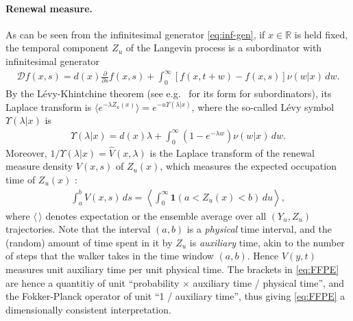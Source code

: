 \documentclass[a4paper,12pt]{article}
\numberwithin{equation}{section}
\theoremstyle{plain}
\theoremstyle{definition}
\theoremstyle{remark}
\numberwithin{equation}{section}
\newcommand{\spc}{\mathbb R}
\newcommand{\1}{\mathbf 1}
\begin{document}
\paragraph{Renewal measure.}
As can be seen from the infinitesimal generator \eqref{eq:inf-gen},
if $x \in \spc$ is held fixed, the temporal component $Z_u$ of the Langevin
process
is a subordinator with infinitesimal generator
\begin{align}
\mathcal D f(x,s) = d(x) \frac{\partial }{\partial s} f(x,s)
+ \int_0^\infty [f(x, t+w) - f(x,s)] \nu(w|x)\,dw.
\end{align}
By the L\'evy-Khintchine theorem (see e.g.\ \cite{Bertoin04} for its form
for subordinators), its Laplace transform is
$\langle e^{-\lambda Z_u(x)} \rangle = e^{-u \Upsilon(\lambda|x)}$, where the
so-called L\'evy symbol $\Upsilon(\lambda|x)$ is
\begin{align}
\Upsilon(\lambda|x) = d(x) \lambda + \int_0^\infty (1-e^{-\lambda w})
\nu(w|x)\, dw.  
\end{align}
Moreover, $1/\Upsilon(\lambda| x) = \hat V(x, \lambda)$ is the Laplace
transform of the renewal measure density $V(x,s)$ of $Z_u(x)$, which measures
the expected occupation time of $Z_u(x)$ \cite{Bertoin04}:
\begin{align}
\int_a^b V(x,s)\, ds = \left \langle \int_0^\infty \1(a < Z_u(x) < b)\,du
\right \rangle,  
\end{align}
where $\langle\,\rangle$ denotes expectation or the ensemble average over all
$(Y_u,Z_u)$ trajectories.
Note that the interval $(a,b)$ is a \emph{physical} time interval, and the 
(random) amount of time spent in it by $Z_u$ is \emph{auxiliary} time, akin to 
the number of steps that the walker takes in the time window $(a,b)$. 
Hence $V(y,t)$ measures unit auxiliary time per unit physical time. The brackets
in \eqref{eq:FFPE} are hence a quantitiy of unit
``probability $\times$ auxiliary time / physical time'',
and the Fokker-Planck operator of unit ``1 / auxiliary time'',
thus giving \eqref{eq:FFPE} a dimensionally consistent interpretation.
\end{document}
